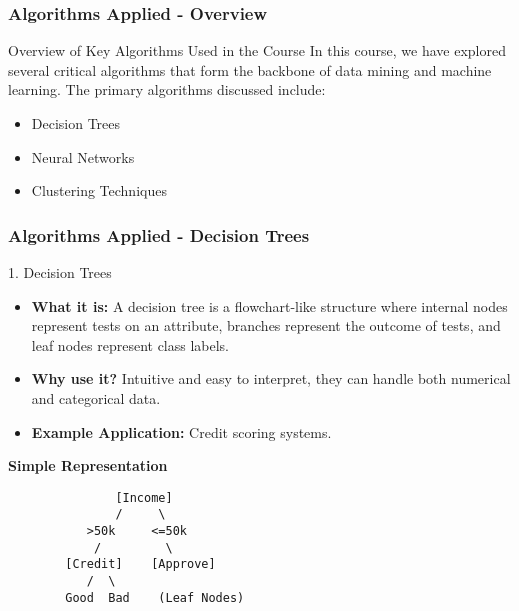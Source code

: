 \documentclass[aspectratio=169]{beamer}
\begin{document}
\begin{frame}[fragile]
    \frametitle{Algorithms Applied - Overview}
    \begin{block}{Overview of Key Algorithms Used in the Course}
        In this course, we have explored several critical algorithms that form the backbone of data mining and machine learning. The primary algorithms discussed include:
    \end{block}
    \begin{itemize}
        \item Decision Trees
        \item Neural Networks
        \item Clustering Techniques
    \end{itemize}
\end{frame}

\begin{frame}[fragile]
    \frametitle{Algorithms Applied - Decision Trees}
    \begin{block}{1. Decision Trees}
        \begin{itemize}
            \item \textbf{What it is:} A decision tree is a flowchart-like structure where internal nodes represent tests on an attribute, branches represent the outcome of tests, and leaf nodes represent class labels.
            \item \textbf{Why use it?} Intuitive and easy to interpret, they can handle both numerical and categorical data.
            \item \textbf{Example Application:} Credit scoring systems.
        \end{itemize}
        \begin{center}
            \textbf{Simple Representation}
            \begin{lstlisting}
               [Income]
               /     \
           >50k     <=50k
            /         \
        [Credit]    [Approve]
           /  \
        Good  Bad    (Leaf Nodes)
            \end{lstlisting}
        \end{center}
    \end{block}
\end{frame}
\end{document}
